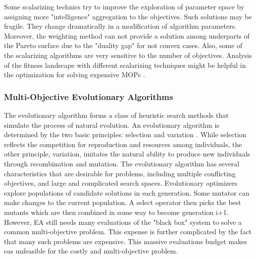                 Some scalarizing technics try to improve the exploration of parameter space by assigning more "intelligence" aggregation to the objectives. Such solutions may be fragile. They change dramatically in a modification of algorithm parameters. Moreover, the weighting method can not provide a solution among underparts of the Pareto surface due to the "duality gap" for not convex cases. Also, some of the scalarizing algorithms are very sensitive to the number of objectives. Analysis of the fitness landscape with different scalarizing techniques might be helpful in the optimization for solving expensive MOPs \cite{ChughScal2019}.



            \subsubsection{Multi-Objective Evolutionary Algorithms}
            The evolutionary algorithm forms a class of heuristic search methods that simulate the process of natural evolution. An evolutionary algorithm is determined by the two basic principles: selection and variation \cite{TutMOEABrockhoff}. While selection reflects the competition for reproduction and resources among individuals, the other principle, variation, imitates the natural ability to produce new individuals through recombination and mutation. 
            The evolutionary algorithm has several characteristics that are desirable for problems, including multiple conflicting objectives, and large and complicated search spaces. Evolutionary optimizers explore populations of candidate solutions in each generation. Some mutator can make changes to the current population. A select operator then picks the best mutants which are then combined in some way to become generation i+1. However, EA still needs many evaluations of the "black box" system to solve a common multi-objective problem. This expense is further complicated by the fact that many such problems are expensive. This massive evaluations budget makes \gls{ea}s unfeasible for the costly and multi-objective problem. 


